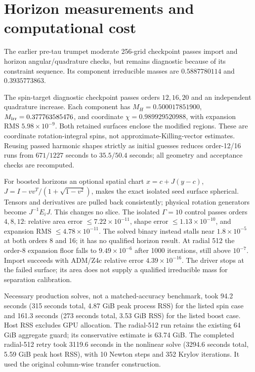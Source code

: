 \documentclass[aps,prd,preprint,notitlepage,nofootinbib]{revtex4-2}
\begin{document}
\section{Horizon measurements and computational cost}
The earlier pre-tau trumpet moderate 256-grid checkpoint passes import and horizon
angular/quadrature checks, but remains diagnostic because of its constraint sequence. Its component
irreducible masses are $0.5887780114$ and $0.3935773863$.

The spin-target diagnostic checkpoint passes orders $12,16,20$ and an independent
quadrature increase. Each component has
$M_H=0.500017851900$, $M_{\rm irr}=0.377763585476$, and coordinate
$\chi=0.989929520988$, with expansion RMS $5.98\times10^{-9}$.
Both retained surfaces enclose the modified regions. These are coordinate
rotation-integral spins, not approximate-Killing-vector estimates.
Reusing passed harmonic shapes strictly as initial guesses reduces order-12/16
runs from $671/1227$ seconds to $35.5/50.4$ seconds; all geometry and acceptance
checks are recomputed.

For boosted horizons an optional spatial chart
$x=c+J(y-c)$, $J=I-vv^T/(1+\sqrt{1-v^2})$, makes the exact isolated seed surface
spherical. Tensors and derivatives are pulled back consistently; physical
rotation generators become $J^{-1}E_iJ$. This changes no slice.
The isolated $\Gamma=10$ control passes orders $4,8,12$: relative area error
$\le7.22\times10^{-11}$, shape error $\le1.13\times10^{-10}$, and expansion
RMS $\le4.78\times10^{-11}$. The solved binary instead stalls near
$1.8\times10^{-5}$ at both orders 8 and 16; it has no qualified horizon result.
At radial 512 the order-8 expansion floor falls to $9.49\times10^{-6}$ after
1000 iterations, still above $10^{-7}$. Import succeeds with ADM/Z4c relative
error $4.39\times10^{-16}$. The driver stops at the failed surface; its area
does not supply a qualified irreducible mass for separation calibration.

Necessary production solves, not a matched-accuracy benchmark, took
94.2 seconds (315 seconds total, 4.87 GiB peak process RSS) for the listed spin
case and 161.3 seconds (273 seconds total, 3.53 GiB RSS) for the listed boost
case. Host RSS excludes GPU allocation. The radial-512 run retains the existing
64 GiB aggregate guard; its conservative estimate is 63.74 GiB.
The completed radial-512 retry took 3119.6 seconds in the nonlinear solve
(3294.6 seconds total, 5.59 GiB peak host RSS), with 10 Newton steps and
352 Krylov iterations. It used the original column-wise transfer construction.
\end{document}
